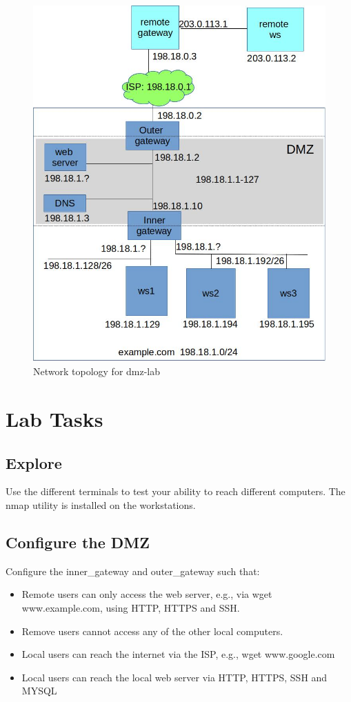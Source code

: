 \begin{figure}[H]
\begin{center}
\includegraphics [width=0.8\linewidth]{dmz-lab.jpg}
\end{center}
\caption{Network topology for dmz-lab}
\label{fig:topology}
\end{figure}

\section{Lab Tasks}
\subsection{Explore}
Use the different terminals to test your ability to reach different computers.
The nmap utility is installed on the workstations.  
\subsection{Configure the DMZ}
Configure the inner\_gateway and outer\_gateway such that:
\begin{itemize}
\item Remote users can only access the web server, e.g., via wget www.example.com, using
HTTP, HTTPS and SSH.
\item Remove users cannot access any of the other local computers.
\item Local users can reach the internet via the ISP, e.g., wget www.google.com
\item Local users can reach the local web server via HTTP, HTTPS, SSH and MYSQL
\end{itemize}

